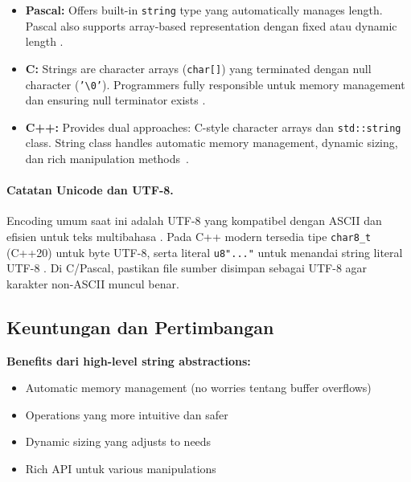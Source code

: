 \documentclass[../main.tex]{subfiles}
\begin{document}
\begin{itemize}
  \item \textbf{Pascal:} Offers built-in \texttt{string} type yang automatically manages length. Pascal also supports array-based representation dengan fixed atau dynamic length \parencite{pascal-tutorial-wikibooks,free-pascal-docs}.
  
  \item \textbf{C:} Strings are character arrays (\texttt{char[]}) yang terminated dengan null character (\texttt{'\textbackslash 0'}). Programmers fully responsible untuk memory management dan ensuring null terminator exists \parencite{iso-c-draft-n1570,c-strings-h,tutorialspoint-c-strings}.
  
  \item \textbf{C++:} Provides dual approaches: C-style character arrays dan \texttt{std::\allowbreak string} class. String class handles automatic memory management, dynamic sizing, dan rich manipulation methods~\parencite{cpp-strings,cplusplus-string,yuliaagustin-string-cpp}.
\end{itemize}

\paragraph{Catatan Unicode dan UTF-8.} Encoding umum saat ini adalah UTF-8 yang kompatibel dengan ASCII dan efisien untuk teks multibahasa \parencite{rfc3629,utf8-everywhere}. Pada C++ modern tersedia tipe \texttt{char8\_t} (C++20) untuk byte UTF-8, serta literal \texttt{u8"..."} untuk menandai string literal UTF-8 \parencite{cpp-char8,cpp-string-literals}. Di C/Pascal, pastikan file sumber disimpan sebagai UTF-8 agar karakter non-ASCII muncul benar.

\subsection{Keuntungan dan Pertimbangan}

\textbf{Benefits dari high-level string abstractions:}
\begin{itemize}
  \item Automatic memory management (no worries tentang buffer overflows)
  \item Operations yang more intuitive dan safer
  \item Dynamic sizing yang adjusts to needs
  \item Rich API untuk various manipulations
\end{itemize}
\end{document}
